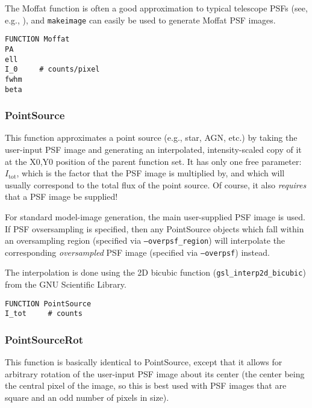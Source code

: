 \documentclass[10pt,a4paper,article]{memoir}
\newcommand{\makeimage}{\texttt{makeimage}}
\begin{document}
The Moffat function is often a good approximation to typical telescope PSFs (see, e.g.,
\citealt{trujillo01}), and \makeimage{} can easily be used to generate Moffat PSF images.

\begin{verbatim}
FUNCTION Moffat
PA
ell
I_0     # counts/pixel
fwhm
beta
\end{verbatim}


%


\subsubsection{PointSource}

This function approximates a point source (e.g., star, AGN, etc.) by
taking the user-input PSF image and generating an interpolated,
intensity-scaled copy of it at the X0,Y0 position of the parent function
set. It has only one free parameter: $I_{\mathrm{tot}}$, which is the
factor that the PSF image is multiplied by, and which will usually
correspond to the total flux of the point source. Of course, it also
\textit{requires} that a PSF image be supplied!

For standard model-image generation, the main user-supplied PSF image is
used. If PSF ovsersampling is specified, then any PointSource objects
which fall within an oversampling region (specified via
\texttt{--overpsf\_region}) will interpolate the corresponding
\textit{oversampled} PSF image (specified via \texttt{--overpsf}) instead.

The interpolation is done using the 2D bicubic function
(\texttt{gsl\_interp2d\_bicubic}) from the GNU Scientific Library.

\begin{verbatim}
FUNCTION PointSource
I_tot     # counts
\end{verbatim}


\subsubsection{PointSourceRot}

This function is basically identical to PointSource, except that it allows
for arbitrary rotation of the user-input PSF image about its center
(the center being the central pixel of the image, so this is best used
with PSF images that are square and an odd number of pixels in size).
\end{document}
